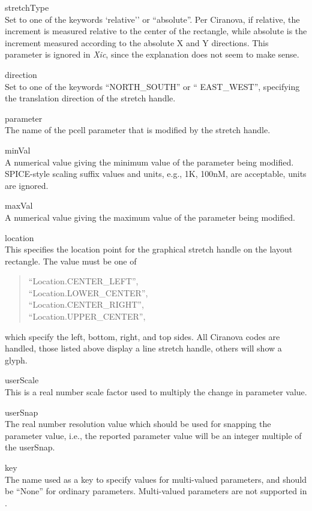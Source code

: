 \begin{description}
\begin{description}
\item{\vt stretchType}\\
Set to one of the keywords `{\vt relative}'' or ``{\vt absolute}''. 
Per Ciranova, if {\vt relative}, the increment is measured relative to
the center of the rectangle, while {\vt absolute} is the increment
measured according to the absolute X and Y directions.  This parameter
is ignored in {\it Xic}, since the explanation does not seem to make
sense.

\item{\vt direction}\\
Set to one of the keywords ``{\vt NORTH\_SOUTH}'' or ``{\vt
EAST\_WEST}'', specifying the translation direction of the stretch
handle.

\item{\vt parameter}\\
The name of the pcell parameter that is modified by the stretch
handle.

\item{\vt minVal}\\
A numerical value giving the minimum value of the parameter being
modified.  SPICE-style scaling suffix values and units, e.g., {\vt
1K}, {\vt 100nM}, are acceptable, units are ignored.

\item{\vt maxVal}\\
A numerical value giving the maximum value of the parameter being
modified.

\item{\vt location}\\
This specifies the location point for the graphical stretch handle
on the layout rectangle.  The value must be one of
\begin{quote}
``{\vt Location.CENTER\_LEFT}'',\\
``{\vt Location.LOWER\_CENTER}'',\\
``{\vt Location.CENTER\_RIGHT}'',\\
``{\vt Location.UPPER\_CENTER}'',\\
\end{quote}
which specify the left, bottom, right, and top sides.  All Ciranova
codes are handled, those listed above display a line stretch handle,
others will show a glyph.

\item{\vt userScale}\\
This is a real number scale factor used to multiply the change in
parameter value.

\item{\vt userSnap}\\
The real number resolution value which should be used for snapping the
parameter value, i.e., the reported parameter value will be an integer
multiple of the {\vt userSnap}.

\item{\vt key}\\
The name used as a key to specify values for multi-valued parameters,
and should be ``{\vt None}'' for ordinary parameters.  Multi-valued
parameters are not supported in {\Xic}.
\end{description}
\end{description}

